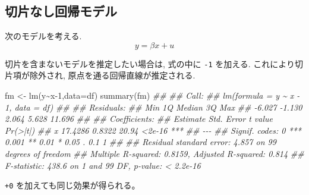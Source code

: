 \documentclass[
  letterpaper,
  xelatex,
  ja=standard, xelatex]{bxjsbook}
\newenvironment{Shaded}{\begin{snugshade}}{\end{snugshade}}
\newcommand{\AttributeTok}[1]{\textcolor[rgb]{0.40,0.45,0.13}{#1}}
\newcommand{\DecValTok}[1]{\textcolor[rgb]{0.68,0.00,0.00}{#1}}
\newcommand{\DocumentationTok}[1]{\textcolor[rgb]{0.37,0.37,0.37}{\textit{#1}}}
\newcommand{\FunctionTok}[1]{\textcolor[rgb]{0.28,0.35,0.67}{#1}}
\newcommand{\NormalTok}[1]{\textcolor[rgb]{0.00,0.23,0.31}{#1}}
\newcommand{\OtherTok}[1]{\textcolor[rgb]{0.00,0.23,0.31}{#1}}
\newcommand{\SpecialCharTok}[1]{\textcolor[rgb]{0.37,0.37,0.37}{#1}}
\begin{document}
\subsection{切片なし回帰モデル}\label{ux5207ux7247ux306aux3057ux56deux5e30ux30e2ux30c7ux30eb}

次のモデルを考える. \[
y = \beta x + u
\]

切片を含まないモデルを推定したい場合は, 式の中に \texttt{-1} を加える.
これにより切片項が除外され, 原点を通る回帰直線が推定される.

\begin{Shaded}
\begin{Highlighting}[]
\NormalTok{fm }\OtherTok{\textless{}{-}} \FunctionTok{lm}\NormalTok{(y}\SpecialCharTok{\textasciitilde{}}\NormalTok{x}\DecValTok{{-}1}\NormalTok{,}\AttributeTok{data=}\NormalTok{df)}
\FunctionTok{summary}\NormalTok{(fm)}
\DocumentationTok{\#\# }
\DocumentationTok{\#\# Call:}
\DocumentationTok{\#\# lm(formula = y \textasciitilde{} x {-} 1, data = df)}
\DocumentationTok{\#\# }
\DocumentationTok{\#\# Residuals:}
\DocumentationTok{\#\#    Min     1Q Median     3Q    Max }
\DocumentationTok{\#\# {-}6.027 {-}1.130  2.064  5.628 11.696 }
\DocumentationTok{\#\# }
\DocumentationTok{\#\# Coefficients:}
\DocumentationTok{\#\#   Estimate Std. Error t value Pr(\textgreater{}|t|)    }
\DocumentationTok{\#\# x  17.4286     0.8322   20.94   \textless{}2e{-}16 ***}
\DocumentationTok{\#\# {-}{-}{-}}
\DocumentationTok{\#\# Signif. codes:  0 \textquotesingle{}***\textquotesingle{} 0.001 \textquotesingle{}**\textquotesingle{} 0.01 \textquotesingle{}*\textquotesingle{} 0.05 \textquotesingle{}.\textquotesingle{} 0.1 \textquotesingle{} \textquotesingle{} 1}
\DocumentationTok{\#\# }
\DocumentationTok{\#\# Residual standard error: 4.857 on 99 degrees of freedom}
\DocumentationTok{\#\# Multiple R{-}squared:  0.8159, Adjusted R{-}squared:  0.814 }
\DocumentationTok{\#\# F{-}statistic: 438.6 on 1 and 99 DF,  p{-}value: \textless{} 2.2e{-}16}
\end{Highlighting}
\end{Shaded}

\texttt{+0} を加えても同じ効果が得られる。
\end{document}
